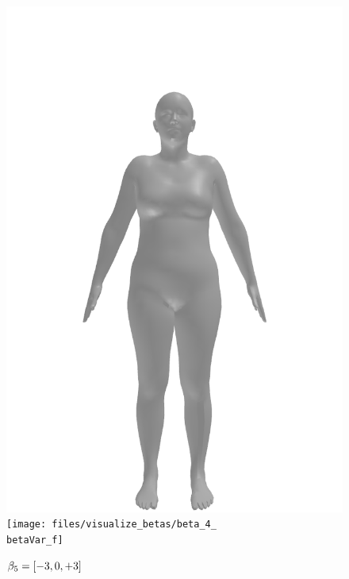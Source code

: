 \begin{figure}[ht!]
\begin{minipage}[b]{\textwidth}
        \includegraphics[width=\imgWidth]{files/visualize_betas/baseline_f}
        \texttt{[image: files/visualize\_betas/beta\_4\_\\betaVar\_f]}
        \caption[Effect of varying $\beta_5$ in SMPL]{$\beta_5 = [-3, 0, +3]$}
    \end{minipage}
\end{figure}

